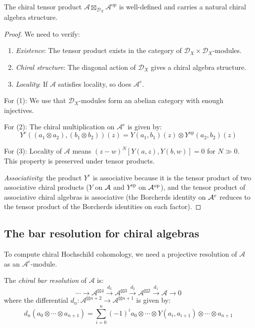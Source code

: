 \begin{lemma}
\label{lem:chiral-enveloping-well-defined}
The chiral tensor product $\mathcal{A} \boxtimes_{\mathcal{D}_X} \mathcal{A}^{\text{op}}$ is well-defined and carries a natural chiral algebra structure.
\end{lemma}

\begin{proof}
We need to verify:
\begin{enumerate}
\item \emph{Existence}: The tensor product exists in the category of $\mathcal{D}_X \times \mathcal{D}_X$-modules.
\item \emph{Chiral structure}: The diagonal action of $\mathcal{D}_X$ gives a chiral algebra structure.
\item \emph{Locality}: If $\mathcal{A}$ satisfies locality, so does $\mathcal{A}^e$.
\end{enumerate}

For (1): We use that $\mathcal{D}_X$-modules form an abelian category with enough injectives.

For (2): The chiral multiplication on $\mathcal{A}^e$ is given by:
\[
Y^e((a_1 \otimes a_2), (b_1 \otimes b_2))(z) = Y(a_1, b_1)(z) \otimes Y^{\text{op}}(a_2, b_2)(z)
\]

For (3): Locality of $\mathcal{A}$ means $(z-w)^N[Y(a,z), Y(b,w)] = 0$ for $N \gg 0$. This property is preserved under tensor products.

\emph{Associativity}: the product $Y^e$ is associative because it
is the tensor product of two associative chiral products ($Y$ on
$\mathcal{A}$ and $Y^{\mathrm{op}}$ on $\mathcal{A}^{\mathrm{op}}$), and the
tensor product of associative chiral algebras is associative
(the Borcherds identity on $\mathcal{A}^e$ reduces to the tensor product
of the Borcherds identities on each factor). \qedhere
\end{proof}

\subsection{The bar resolution for chiral algebras}

To compute chiral Hochschild cohomology, we need a projective resolution of $\mathcal{A}$ as an $\mathcal{A}^e$-module.

\begin{definition}
The \emph{chiral bar resolution} of $\mathcal{A}$ is:
\[
\cdots \to \mathcal{A}^{\boxtimes 4} \xrightarrow{d_3} \mathcal{A}^{\boxtimes 3} \xrightarrow{d_2} \mathcal{A}^{\boxtimes 2} \xrightarrow{d_1} \mathcal{A} \to 0
\]
where the differential $d_n: \mathcal{A}^{\boxtimes n+2} \to \mathcal{A}^{\boxtimes n+1}$ is given by:
\[
d_n(a_0 \otimes \cdots \otimes a_{n+1}) = \sum_{i=0}^n (-1)^i a_0 \otimes \cdots \otimes Y(a_i, a_{i+1}) \otimes \cdots \otimes a_{n+1}
\]
\end{definition}

